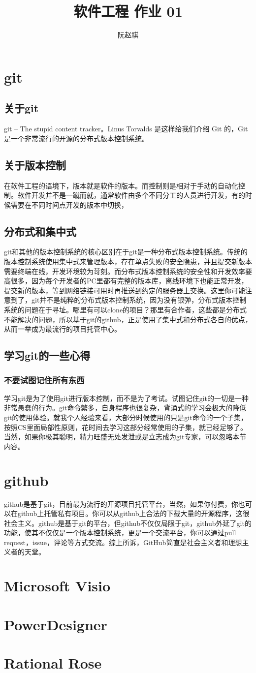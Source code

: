\documentclass{article}
\title{软件工程 作业 01}
\author{阮赵祺}
\begin{document}
	\maketitle
	\section{git}
	\subsection{关于git}
	git --	The stupid content tracker。Linus Torvalds 是这样给我们介绍 Git 的，Git是一个非常流行的开源的分布式版本控制系统。
	\subsection{关于版本控制}
	在软件工程的语境下，版本就是软件的版本。而控制则是相对于手动的自动化控制。软件开发并不是一蹴而就，通常软件由多个不同分工的人员进行开发，有的时候需要在不同时间点开发的版本中切换，
	\subsection{分布式和集中式}
	git和其他的版本控制系统的核心区别在于git是一种分布式版本控制系统。传统的版本控制系统使用集中式来管理版本，存在单点失败的安全隐患，并且提交新版本需要终端在线，开发环境较为苛刻。而分布式版本控制系统的安全性和开发效率要高很多，因为每个开发者的PC里都有完整的版本库，离线环境下也能正常开发，提交新的版本，等到网络链接可用时再推送到约定的服务器上交换。这里你可能注意到了，git并不是纯粹的分布式版本控制系统，因为没有银弹，分布式版本控制系统的问题在于寻址。哪里有可以clone的项目？那里有合作者，这些都是分布式不能解决的问题，所以基于git的github，正是使用了集中式和分布式各自的优点，从而一举成为最流行的项目托管中心。
	\subsection{学习git的一些心得}
	\subsubsection{不要试图记住所有东西}
	学习git是为了使用git进行版本控制，而不是为了考试。试图记住git的一切是一种非常愚蠢的行为。git命令繁多，自身程序也很复杂，背诵式的学习会极大的降低git的使用体验。就我个人经验来看，大部分时候使用的只是git命令的一个子集，按照CS里面局部性原则，花时间去学习这部分经常使用的子集，就已经足够了。当然，如果你极其聪明，精力旺盛无处发泄或是立志成为git专家，可以忽略本节内容。
	\section{github}
	github是基于git，目前最为流行的开源项目托管平台，当然，如果你付费，你也可以在github上托管私有项目。你可以从github上合法的下载大量的开源程序，这很社会主义。github是基于git的平台，但github不仅仅局限于git，github外延了git的功能，使其不仅仅是一个版本控制系统，更是一个交流平台，你可以通过pull request，issue，评论等方式交流。综上所诉，GitHub简直是社会主义者和理想主义者的天堂。
	\section{Microsoft Visio}
	\section{PowerDesigner}
	\section{Rational Rose}
\end{document}
